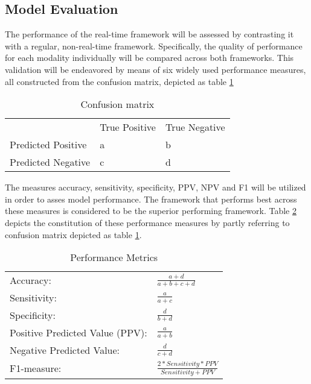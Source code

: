 \documentclass{article}
\begin{document}
\subsection{Model Evaluation}
The performance of the real-time framework will be assessed by contrasting it with a regular, non-real-time framework. Specifically, the quality of performance for each modality individually will be compared across both frameworks. This validation will be endeavored by means of six widely used performance measures, all constructed from the confusion matrix, depicted as table  \ref{table:confusion}  
\bigskip
\bgroup
\def\arraystretch{1.6}%
\begin{table}[h]
\centering
\caption{Confusion matrix}
\label{table:confusion}
\begin{tabular}{lll}
                                        & True Positive          & True Negative          \\ \cline{2-3} 
\multicolumn{1}{l|}{Predicted Positive} & \multicolumn{1}{l|}{a} & \multicolumn{1}{l|}{b} \\ \cline{2-3} 
\multicolumn{1}{l|}{Predicted Negative} & \multicolumn{1}{l|}{c} & \multicolumn{1}{l|}{d} \\ \cline{2-3} 
\end{tabular}
\end{table}
\egroup

The measures accuracy, sensitivity, specificity, PPV, NPV and F1 will be utilized in order to asses model performance. The framework that performs best across these measures is considered to be the superior performing framework. Table \ref{table:metrics} depicts the constitution of these performance measures by partly referring to confusion matrix depicted as table \ref{table:confusion}. 
\bigskip
\bgroup
\def\arraystretch{1.8}%
\begin{table}[h]
\centering
\caption{Performance Metrics}
\label{table:metrics}
\begin{tabular}{ll}
\hline
Accuracy:                       & \(\frac{\!\!\!\!\!\!\!\!\!\!\!\!\!\!a+d}{a+b+c+d}\) \\
Sensitivity:                    & \(\frac{a}{a+c}\)                                   \\
Specificity:                    & \(\frac{d}{b+d}\)                                   \\
Positive Predicted Value (PPV): & \(\frac{a}{a+b}\)                                   \\
Negative Predicted Value:       & \(\frac{d}{c+d}\)                                   \\
F1-measure:                     & \(\frac{2*Sensitivity*PPV}{Sensitivity+PPV}\)       \\ \hline
\end{tabular}
\end{table}
\egroup

\newpage



\end{document}
